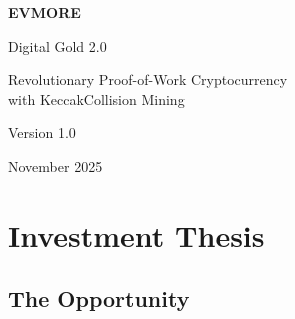 \documentclass[11pt,a4paper]{article}
\begin{document}
\begin{titlepage}
    \centering
    \vspace*{2cm}

    {\Huge\bfseries\textcolor{evmoreblue}{EVMORE}\par}
    \vspace{0.5cm}
    {\LARGE\textcolor{evmoregold}{Digital Gold 2.0}\par}
    \vspace{1cm}
    {\Large Revolutionary Proof-of-Work Cryptocurrency\\with KeccakCollision Mining\par}

    \vspace{2cm}

    {\large Version 1.0\par}
    {\large November 2025\par}

    \vfill

    \begin{abstract}
        \noindent EVMORE introduces a novel approach to digital gold through KeccakCollision proof-of-work mining, a memory-hard algorithm designed for ASIC resistance and fair distribution. Building on foundational work in cryptographic proof-of-work [1, 3] and memory-hard functions [2, 4], this whitepaper presents a unique 4-stage deployment architecture that enables zero-budget bootstrap launch while progressively expanding to federated cross-chain mining. With a fixed supply of 21 million tokens, Bitcoin-inspired halving schedule, and self-funding economics, EVMORE represents the next evolution in decentralized digital gold with genuine utility across multiple blockchain networks.
    \end{abstract}

\end{titlepage}

\tableofcontents
\newpage

\section{Investment Thesis}

\subsection{The Opportunity}
\end{document}
